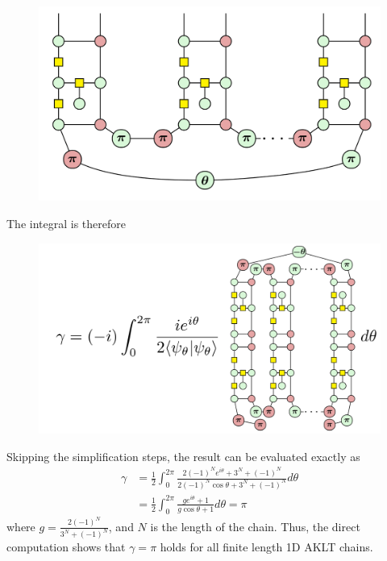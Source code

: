 \documentclass[aspectratio=169,xcolor=dvipsnames, t]{beamer}
\begin{document}
\begin{frame}
    \begin{figure}
        \includegraphics[width=.8\textwidth]{figures/zx_berry_phase_state.png}
    \end{figure}
    
\end{frame}
\begin{frame}
    The integral is therefore
    \begin{figure}
        \includegraphics[width=.8\textwidth]{figures/zx_berry_phase_integral.png}
    \end{figure}
\end{frame}

\begin{frame}
    Skipping the simplification steps, the result can be evaluated exactly as
    \begin{align*}
        \gamma &= \frac{1}{2}\int_{0}^{2\pi} \frac{2(-1)^N e^{i\theta} + 3^N + (-1)^N}{2(-1)^N \cos \theta + 3^N + (-1)^N} d\theta\\
        &= \frac{1}{2} \int_{0}^{2\pi} \frac{g e^{i\theta} + 1}{g\cos \theta +1} d\theta = \boxed{\pi}
    \end{align*}
    where $g = \frac{2(-1)^N}{3^N+(-1)^N}$, and $N$ is the length of the chain.
    Thus, the direct computation shows that $\boxed{\gamma = \pi}$ holds for all finite length 1D AKLT chains.

\end{frame}
\end{document}
